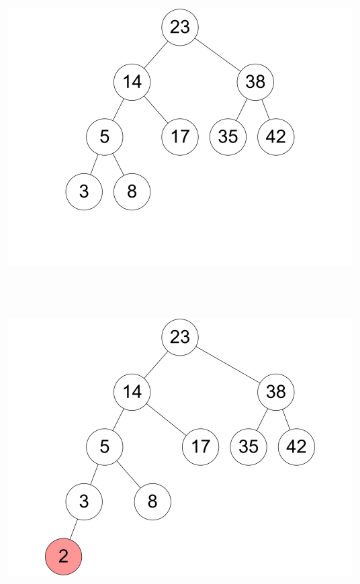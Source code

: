 \documentclass[11pt,a4paper]{article}
\begin{document}
\begin{loesung}
\begin{enumerate}
\begin{figure}[h!]
\begin{subfigure}[b]{0.23\textwidth}
                \includegraphics[width=\textwidth]{img/3a_9}
                \caption*{}
            \end{subfigure}
            \\
            \begin{subfigure}[b]{0.23\textwidth}
                \centering
                \includegraphics[width=\textwidth]{img/3a_10}
                \caption*{}
            \end{subfigure}
            \begin{subfigure}[b]{0.23\textwidth}
                \centering

\end{subfigure}
\end{figure}
\end{enumerate}
\end{loesung}
\end{document}
